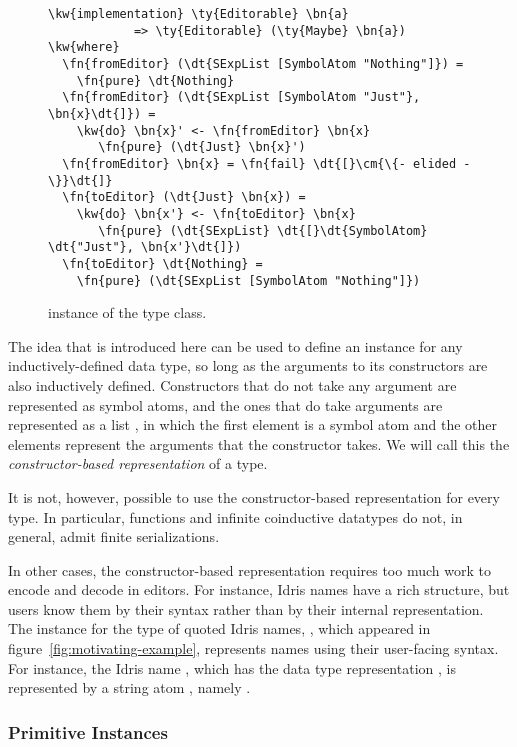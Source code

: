 \begin{figure}[H]
\begin{Verbatim}
\kw{implementation} \ty{Editorable} \bn{a}
            => \ty{Editorable} (\ty{Maybe} \bn{a}) \kw{where}
  \fn{fromEditor} (\dt{SExpList [SymbolAtom "Nothing"]}) =
    \fn{pure} \dt{Nothing}
  \fn{fromEditor} (\dt{SExpList [SymbolAtom "Just"}, \bn{x}\dt{]}) =
    \kw{do} \bn{x}' <- \fn{fromEditor} \bn{x}
       \fn{pure} (\dt{Just} \bn{x}')
  \fn{fromEditor} \bn{x} = \fn{fail} \dt{[}\cm{\{- elided -\}}\dt{]}
  \fn{toEditor} (\dt{Just} \bn{x}) =
    \kw{do} \bn{x'} <- \fn{toEditor} \bn{x}
       \fn{pure} (\dt{SExpList} \dt{[}\dt{SymbolAtom} \dt{"Just"}, \bn{x'}\dt{]})
  \fn{toEditor} \dt{Nothing} =
    \fn{pure} (\dt{SExpList [SymbolAtom "Nothing"]})
\end{Verbatim}
\label{code:editorableMaybe}
\caption{ instance of the  type class.}
\end{figure}

The idea that is introduced here can be used to define an
\Editorable{} instance for any inductively-defined data type, so long
as the arguments to its constructors are also inductively
defined. Constructors that do not take any argument are represented as
symbol atoms, and the ones that do take arguments are represented as a
list \sexp{}, in which the first element is a symbol atom and the
other elements represent the arguments that the constructor takes. We
will call this the \emph{constructor-based \sexp{} representation} of
a type.

It is not, however, possible to use the constructor-based representation for every type.
In particular, functions and infinite coinductive datatypes do not, in general, admit finite serializations.

In other cases, the constructor-based representation requires too much work to encode and decode in editors.
For instance, Idris names have a rich structure, but users know them by their syntax rather than by their internal representation.
The \Editorable{} instance for the type of quoted Idris
names, , which appeared in figure~\ref{fig:motivating-example}, represents names using their user-facing syntax.
For instance, the Idris name , which has the
data type representation , is
represented by a string atom \sexp{}, namely .

\subsubsection{Primitive \Editorable{} Instances}
\label{sssec:primitiveEditorable}

